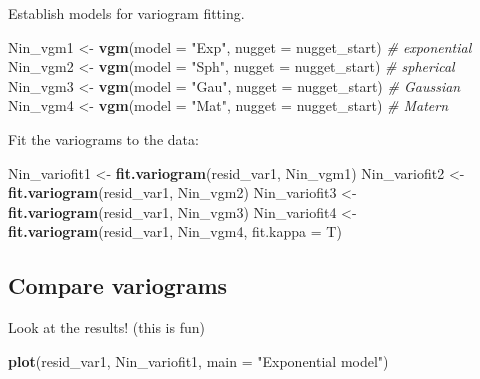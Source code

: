 \documentclass[
]{book}
\newenvironment{Shaded}{\begin{snugshade}}{\end{snugshade}}
\newcommand{\AttributeTok}[1]{\textcolor[rgb]{0.13,0.29,0.53}{#1}}
\newcommand{\CommentTok}[1]{\textcolor[rgb]{0.56,0.35,0.01}{\textit{#1}}}
\newcommand{\FunctionTok}[1]{\textcolor[rgb]{0.13,0.29,0.53}{\textbf{#1}}}
\newcommand{\NormalTok}[1]{#1}
\newcommand{\OtherTok}[1]{\textcolor[rgb]{0.56,0.35,0.01}{#1}}
\newcommand{\StringTok}[1]{\textcolor[rgb]{0.31,0.60,0.02}{#1}}
\begin{document}
Establish models for variogram fitting.

\begin{Shaded}
\begin{Highlighting}[]
\NormalTok{Nin\_vgm1 }\OtherTok{\textless{}{-}} \FunctionTok{vgm}\NormalTok{(}\AttributeTok{model =} \StringTok{"Exp"}\NormalTok{, }\AttributeTok{nugget =}\NormalTok{ nugget\_start) }\CommentTok{\# exponential}
\NormalTok{Nin\_vgm2 }\OtherTok{\textless{}{-}} \FunctionTok{vgm}\NormalTok{(}\AttributeTok{model =} \StringTok{"Sph"}\NormalTok{, }\AttributeTok{nugget =}\NormalTok{ nugget\_start) }\CommentTok{\# spherical}
\NormalTok{Nin\_vgm3 }\OtherTok{\textless{}{-}} \FunctionTok{vgm}\NormalTok{(}\AttributeTok{model =} \StringTok{"Gau"}\NormalTok{, }\AttributeTok{nugget =}\NormalTok{ nugget\_start) }\CommentTok{\# Gaussian}
\NormalTok{Nin\_vgm4 }\OtherTok{\textless{}{-}} \FunctionTok{vgm}\NormalTok{(}\AttributeTok{model =} \StringTok{"Mat"}\NormalTok{, }\AttributeTok{nugget =}\NormalTok{ nugget\_start) }\CommentTok{\# Matern}
\end{Highlighting}
\end{Shaded}

Fit the variograms to the data:

\begin{Shaded}
\begin{Highlighting}[]
\NormalTok{Nin\_variofit1 }\OtherTok{\textless{}{-}} \FunctionTok{fit.variogram}\NormalTok{(resid\_var1, Nin\_vgm1)}
\NormalTok{Nin\_variofit2 }\OtherTok{\textless{}{-}} \FunctionTok{fit.variogram}\NormalTok{(resid\_var1, Nin\_vgm2)}
\NormalTok{Nin\_variofit3 }\OtherTok{\textless{}{-}} \FunctionTok{fit.variogram}\NormalTok{(resid\_var1, Nin\_vgm3)}
\NormalTok{Nin\_variofit4 }\OtherTok{\textless{}{-}} \FunctionTok{fit.variogram}\NormalTok{(resid\_var1, Nin\_vgm4, }\AttributeTok{fit.kappa =}\NormalTok{ T)}
\end{Highlighting}
\end{Shaded}

\hypertarget{compare-variograms}{%
\subsection{Compare variograms}\label{compare-variograms}}

Look at the results! (this is fun)

\begin{Shaded}
\begin{Highlighting}[]
\FunctionTok{plot}\NormalTok{(resid\_var1, Nin\_variofit1, }\AttributeTok{main =} \StringTok{"Exponential model"}\NormalTok{)}
\end{Highlighting}
\end{Shaded}
\end{document}
